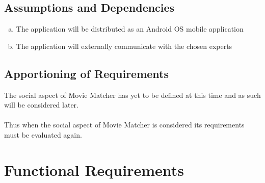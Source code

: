 \documentclass[]{article}
\begin{document}
\subsection{Assumptions and Dependencies}
\label{sub:assumptions_and_dependencies}
\begin{enumerate}[a)]
	\item The application will be distributed as an Android OS mobile application
	\item The application will externally communicate with the chosen experts
\end{enumerate}

\subsection{Apportioning of Requirements}
\label{sub:apportioning_of_requirements}
The social aspect of Movie Matcher has yet to be defined at this time and as such will be considered later.\\
\\
Thus when the social aspect of Movie Matcher is considered its requirements must be evaluated again.


\section{Functional Requirements} \label{freq}
\label{sec:functional_requirements}
\end{document}

